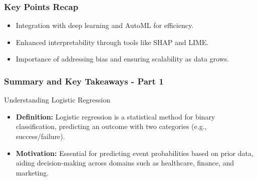 \documentclass[aspectratio=169]{beamer}
\begin{document}
\begin{frame}[fragile]
  \frametitle{Key Points Recap}

  \begin{itemize}
    \item Integration with deep learning and AutoML for efficiency.
    \item Enhanced interpretability through tools like SHAP and LIME.
    \item Importance of addressing bias and ensuring scalability as data grows.
  \end{itemize}
  
\end{frame}

\begin{frame}[fragile]
    \frametitle{Summary and Key Takeaways - Part 1}
    \begin{block}{Understanding Logistic Regression}
        \begin{itemize}
            \item \textbf{Definition:} Logistic regression is a statistical method for binary classification, predicting an outcome with two categories (e.g., success/failure).
            \item \textbf{Motivation:} Essential for predicting event probabilities based on prior data, aiding decision-making across domains such as healthcare, finance, and marketing.
        \end{itemize}
    \end{block}
\end{frame}
\end{document}
